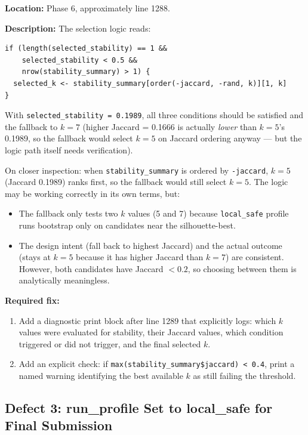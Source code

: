 \documentclass[11pt]{article}
\begin{document}
\textbf{Location:} Phase 6, approximately line 1288.

\textbf{Description:} The selection logic reads:
\begin{verbatim}
if (length(selected_stability) == 1 &&
    selected_stability < 0.5 &&
    nrow(stability_summary) > 1) {
  selected_k <- stability_summary[order(-jaccard, -rand, k)][1, k]
}
\end{verbatim}

With \texttt{selected\_stability = 0.1989}, all three conditions should be
satisfied and the fallback to $k=7$ (higher Jaccard = 0.1666 is actually
\textit{lower} than $k=5$'s 0.1989, so the fallback would select $k=5$ on
Jaccard ordering anyway --- but the logic path itself needs verification).

On closer inspection: when \texttt{stability\_summary} is ordered by
\texttt{-jaccard}, $k=5$ (Jaccard 0.1989) ranks first, so the fallback would
still select $k=5$. The logic may be working correctly in its own terms, but:

\begin{itemize}
\item The fallback only tests two $k$ values (5 and 7) because \texttt{local\_safe}
  profile runs bootstrap only on candidates near the silhouette-best.
\item The design intent (fall back to highest Jaccard) and the actual outcome
  (stays at $k=5$ because it has higher Jaccard than $k=7$) are consistent.
  However, both candidates have Jaccard $< 0.2$, so choosing between them is
  analytically meaningless.
\end{itemize}

\textbf{Required fix:}
\begin{enumerate}
\item Add a diagnostic print block after line 1289 that explicitly logs:
  which $k$ values were evaluated for stability, their Jaccard values, which
  condition triggered or did not trigger, and the final selected $k$.
\item Add an explicit check: if \texttt{max(stability\_summary\$jaccard) < 0.4},
  print a named warning identifying the best available $k$ as still failing
  the threshold.
\end{enumerate}

\subsection{Defect 3: run\_profile Set to local\_safe for Final Submission}
\end{document}
